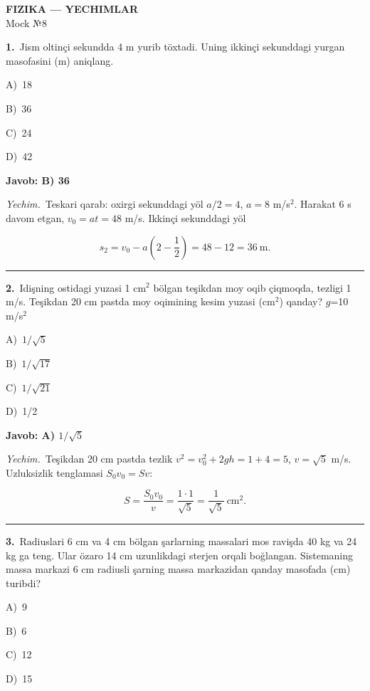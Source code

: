 \documentclass[11pt,a4paper]{article}
\newcommand{\opt}[2]{\hspace*{4mm}#1)\ #2\par}
\begin{document}
\begin{center}{\Large\textbf{FIZIKA — YECHIMLAR}}\\[2pt]{\large Mock №8}\end{center}
\noindent\begin{minipage}{\linewidth}
\textbf{1.}\ Jism oltinçi sekundda 4 m yurib töxtadi. Uning ikkinçi sekunddagi yurgan masofasini (m) aniqlang.\par\smallskip
\opt{A}{18}
\opt{B}{36}
\opt{C}{24}
\opt{D}{42}
\end{minipage}\vspace{2pt}\par
\noindent\colorbox{gray!12}{\parbox{\dimexpr\linewidth-2\fboxsep}{\textbf{Javob: B) 36}}}\par\smallskip
\noindent\textit{Yechim.}\ Teskari qarab: oxirgi sekunddagi yöl $a/2=4$, $a=8$ m/s$^2$. Harakat 6 s davom etgan, $v_0=at=48$ m/s. Ikkinçi sekunddagi yöl\par
\[s_2=v_0-a\left(2-\frac12\right)=48-12=36\ \text{m}.\]\par\medskip\hrule\medskip
{}\noindent\begin{minipage}{\linewidth}
\textbf{2.}\ Idişning ostidagi yuzasi 1 cm$^{2}$ bölgan teşikdan moy oqib çiqmoqda, tezligi 1 m/s. Teşikdan 20 cm pastda moy oqimining kesim yuzasi (cm$^{2}$) qanday? $g$=10 m/s$^{2}$\par\smallskip
\opt{A}{$1/\sqrt{5}$}
\opt{B}{$1/\sqrt{17}$}
\opt{C}{$1/\sqrt{21}$}
\opt{D}{1/2}
\end{minipage}\vspace{2pt}\par
\noindent\colorbox{gray!12}{\parbox{\dimexpr\linewidth-2\fboxsep}{\textbf{Javob: A) $1/\sqrt{5}$}}}\par\smallskip
\noindent\textit{Yechim.}\ Teşikdan 20 cm pastda tezlik $v^2=v_0^2+2gh=1+4=5$, $v=\sqrt5$ m/s. Uzluksizlik tenglamasi $S_0v_0=Sv$:\par
\[S=\frac{S_0v_0}{v}=\frac{1\cdot1}{\sqrt5}=\frac{1}{\sqrt5}\ \text{cm}^2.\]\par\medskip\hrule\medskip
{}\noindent\begin{minipage}{\linewidth}
\textbf{3.}\ Radiuslari 6 cm va 4 cm bölgan şarlarning massalari mos ravişda 40 kg va 24 kg ga teng. Ular özaro 14 cm uzunlikdagi sterjen orqali boğlangan. Sistemaning massa markazi 6 cm radiusli şarning massa markazidan qanday masofada (cm) turibdi?\par\smallskip
\opt{A}{9}
\opt{B}{6}
\opt{C}{12}
\opt{D}{15}
\end{minipage}\vspace{2pt}\par
\end{document}
